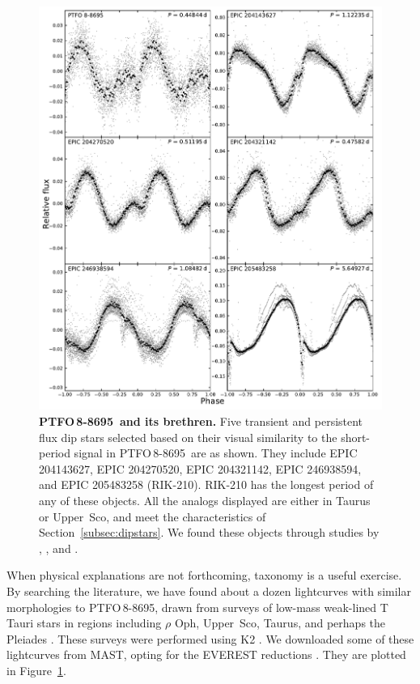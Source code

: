 \documentclass[12pt,twocolumn,tighten]{aastex62}
\newcommand{\ptfo}{PTFO$\,$8-8695}
\begin{document}
\begin{figure}[hbtp]
	\begin{center}
		\leavevmode
		\includegraphics[width=1\textwidth]{f7.pdf}
	\end{center}
	\vspace{-0.7cm}
  \caption{ {\bf \ptfo\ and its brethren.}
    Five transient and persistent flux dip stars selected based on
    their visual similarity to the short-period signal in \ptfo\ are as
    shown.
    They include
    EPIC 204143627,
    EPIC 204270520,
    EPIC 204321142,
    EPIC 246938594,
    and
    EPIC 205483258 (RIK-210).
    RIK-210 has the longest period of any of these objects.  All the
    analogs displayed are either in Taurus or Upper~Sco, and meet the
    characteristics of Section~\ref{subsec:dipstars}.  We found these
    objects through studies by \citet{stauffer_orbiting_2017},
    \citet{david_transient_2017}, and \citet{rebull_usco_2018}.
		\label{fig:brethren}
	}
\end{figure}

When physical explanations are not forthcoming, taxonomy is a useful
exercise.  By searching the literature, we have found about a dozen
lightcurves with similar morphologies to \ptfo, drawn from surveys of
low-mass weak-lined T Tauri stars in regions including $\rho$ Oph,
Upper~Sco, Taurus, and perhaps the Pleiades
\citep{rebull_rotation_2016,david_transient_2017,stauffer_orbiting_2017,stauffer_rotevol_2018,rebull_usco_2018,rebull_rotation_2020}.
These surveys were performed using K2 \citep{howell_k2_2014}.  We
downloaded some of these lightcurves from MAST, opting for the EVEREST
reductions \citep{luger_everest_2016,luger_update_2018}.  They are
plotted in Figure~\ref{fig:brethren}.
\end{document}
